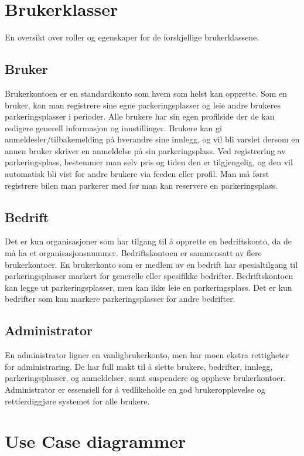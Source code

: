 \documentclass[12pt]{article}
\begin{document}
\section{Brukerklasser}
En oversikt over roller og egenskaper for de forskjellige brukerklassene.

    \subsection{Bruker}
    Brukerkontoen er en standardkonto som hvem som helst kan opprette. Som en bruker, kan man registrere sine egne parkeringsplasser og leie andre brukeres parkeringsplasser i perioder. Alle brukere har sin egen profilside der de kan redigere generell informasjon og innstillinger. Brukere kan gi anmeldesler/tilbakemelding på hverandre sine innlegg, og vil bli varslet dersom en annen bruker skriver en anmeldelse på sin parkeringsplass. Ved registrering av parkeringsplass, bestemmer man selv pris og tiden den er tilgjengelig, og den vil automatisk bli vist for andre brukere via feeden eller profil. Man må først registrere bilen man parkerer med før man kan reservere en parkeringsplass.

    \subsection{Bedrift}
    Det er kun organisasjoner som har tilgang til å opprette en bedriftskonto, da de må ha et organisasjonsnummer. Bedriftskontoen er sammensatt av flere brukerkontoer. En brukerkonto som er medlem av en bedrift har spesialtilgang til parkeringsplasser markert for generelle eller spesifikke bedrifter. Bedriftskontoen kan legge ut parkeringsplasser, men kan ikke leie en parkeringsplass. Det er kun bedrifter som kan markere parkeringsplasser for andre bedrifter.

    \subsection{Administrator}
    En administrator ligner en vanligbrukerkonto, men har moen ekstra rettigheter for administraring. De har full makt til å slette brukere, bedrifter, innlegg, parkeringsplasser, og anmeldelser, samt suspendere og oppheve brukerkontoer. Administrator er essensiell for å vedlikeholde en god brukeropplevelse og rettferdiggjøre systemet for alle brukere.

\section{Use Case diagrammer}
\end{document}
